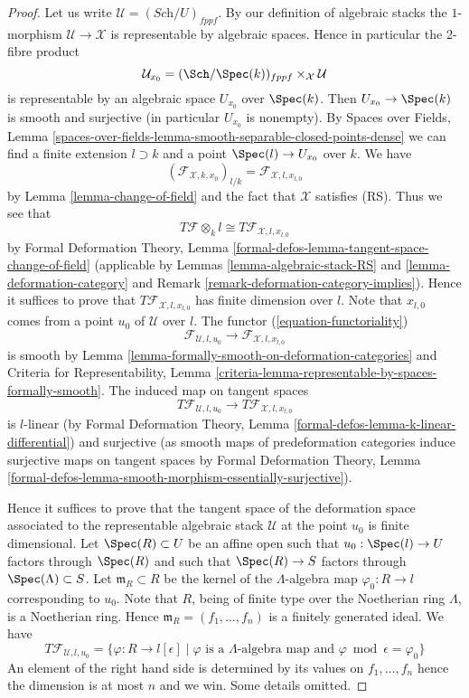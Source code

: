 \begin{proof}
Let us write $\mathcal{U} = (\textit{Sch}/U)_{fppf}$. By our definition
of algebraic stacks the $1$-morphism $\mathcal{U} \to \mathcal{X}$
is representable by algebraic spaces. Hence in particular the
2-fibre product
$$
\mathcal{U}_{x_0} = (\Sch/\Spec(k))_{fppf} \times_\mathcal{X} \mathcal{U}
$$
is representable by an algebraic space $U_{x_0}$ over $\Spec(k)$. Then
$U_{x_0} \to \Spec(k)$ is smooth and surjective (in particular $U_{x_0}$
is nonempty). By Spaces over Fields, Lemma
\ref{spaces-over-fields-lemma-smooth-separable-closed-points-dense}
we can find a finite extension $l \supset k$ and a point
$\Spec(l) \to U_{x_0}$ over $k$. We have
$$
(\mathcal{F}_{\mathcal{X}, k , x_0})_{l/k} =
\mathcal{F}_{\mathcal{X}, l, x_{l, 0}}
$$
by Lemma \ref{lemma-change-of-field} and the fact that $\mathcal{X}$
satisfies (RS). Thus we see that
$$
T\mathcal{F} \otimes_k l \cong T\mathcal{F}_{\mathcal{X}, l, x_{l, 0}}
$$
by
Formal Deformation Theory, Lemma
\ref{formal-defos-lemma-tangent-space-change-of-field}
(applicable by
Lemmas \ref{lemma-algebraic-stack-RS} and
\ref{lemma-deformation-category} and
Remark \ref{remark-deformation-category-implies}).
Hence it suffices to prove that $T\mathcal{F}_{\mathcal{X}, l, x_{l, 0}}$
has finite dimension over $l$. Note that $x_{l, 0}$ comes from a point
$u_0$ of $\mathcal{U}$ over $l$. The functor (\ref{equation-functoriality})
$$
\mathcal{F}_{\mathcal{U}, l, u_0}
\longrightarrow
\mathcal{F}_{\mathcal{X}, l, x_{l, 0}}
$$
is smooth by Lemma \ref{lemma-formally-smooth-on-deformation-categories}
and Criteria for Representability, Lemma
\ref{criteria-lemma-representable-by-spaces-formally-smooth}.
The induced map on tangent spaces
$$
T\mathcal{F}_{\mathcal{U}, l, u_0}
\longrightarrow
T\mathcal{F}_{\mathcal{X}, l, x_{l, 0}}
$$
is $l$-linear (by
Formal Deformation Theory, Lemma
\ref{formal-defos-lemma-k-linear-differential})
and surjective (as smooth maps of predeformation categories induce
surjective maps on tangent spaces by
Formal Deformation Theory, Lemma
\ref{formal-defos-lemma-smooth-morphism-essentially-surjective}).

\medskip\noindent
Hence it suffices to prove that the tangent space of the deformation
space associated to the representable algebraic stack $\mathcal{U}$
at the point $u_0$ is finite dimensional. Let $\Spec(R) \subset U$ be
an affine open such that $u_0 : \Spec(l) \to U$ factors through $\Spec(R)$
and such that $\Spec(R) \to S$ factors through $\Spec(\Lambda) \subset S$.
Let $\mathfrak m_R \subset R$ be the kernel of the $\Lambda$-algebra map
$\varphi_0 : R \to l$ corresponding to $u_0$. Note that $R$, being of finite
type over the Noetherian ring $\Lambda$, is a Noetherian ring. Hence
$\mathfrak m_R = (f_1, \ldots, f_n)$ is a finitely generated ideal.
We have
$$
T\mathcal{F}_{\mathcal{U}, l, u_0}
=
\{\varphi : R \to l[\epsilon] \mid
\varphi \text{ is a } \Lambda\text{-algebra map and }
\varphi \bmod \epsilon = \varphi_0\}
$$
An element of the right hand side is determined by its values on
$f_1, \ldots, f_n$ hence the dimension is at most $n$ and we win.
Some details omitted.
\end{proof}







